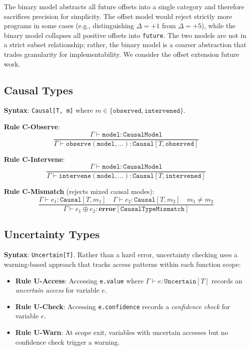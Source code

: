 \documentclass[11pt,a4paper]{article}
\newcommand{\ty}[1]{\texttt{#1}}
\begin{document}
The binary model abstracts all future offsets into a single category and therefore sacrifices precision for simplicity. The offset model would reject strictly more programs in some cases (e.g., distinguishing $\Delta = +1$ from $\Delta = +5$), while the binary model collapses all positive offsets into \ty{future}. The two models are not in a strict subset relationship; rather, the binary model is a coarser abstraction that trades granularity for implementability. We consider the offset extension future work.

\subsection{Causal Types}
\label{sec:causal}

\textbf{Syntax}: \ty{Causal[T, m]} where $m \in \{\ty{observed}, \ty{intervened}\}$.

\textbf{Rule C-Observe}:
\begin{equation}
\frac{\Gamma \vdash \ty{model} : \ty{CausalModel}}{\Gamma \vdash \ty{observe}(\ty{model}, \ldots) : \ty{Causal}[T, \ty{observed}]}
\end{equation}

\textbf{Rule C-Intervene}:
\begin{equation}
\frac{\Gamma \vdash \ty{model} : \ty{CausalModel}}{\Gamma \vdash \ty{intervene}(\ty{model}, \ldots) : \ty{Causal}[T, \ty{intervened}]}
\end{equation}

\textbf{Rule C-Mismatch} (rejects mixed causal modes):
\begin{equation}
\frac{\Gamma \vdash e_1 : \ty{Causal}[T, m_1] \quad \Gamma \vdash e_2 : \ty{Causal}[T, m_2] \quad m_1 \neq m_2}{\Gamma \vdash e_1 \oplus e_2 : \textbf{error}[\ty{CausalTypeMismatch}]}
\end{equation}

\subsection{Uncertainty Types}
\label{sec:uncertainty}

\textbf{Syntax}: \ty{Uncertain[T]}. Rather than a hard error, uncertainty checking uses a warning-based approach that tracks access patterns within each function scope:

\begin{itemize}[itemsep=2pt]
  \item \textbf{Rule U-Access}: Accessing \ty{e.value} where $\Gamma \vdash e : \ty{Uncertain}[T]$ records an \emph{uncertain access} for variable $e$.
  \item \textbf{Rule U-Check}: Accessing \ty{e.confidence} records a \emph{confidence check} for variable $e$.
  \item \textbf{Rule U-Warn}: At scope exit, variables with uncertain accesses but no confidence check trigger a warning.
\end{itemize}
\end{document}
